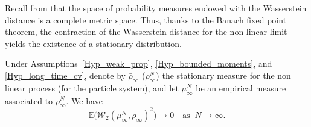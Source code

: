 Recall from \cite{bolley_separability} that the space of probability measures endowed with the Wasserstein distance is a complete metric space. Thus, thanks to the Banach fixed point theorem, the contraction of the Wasserstein distance for the non linear limit yields the existence of a stationary distribution.

\begin{lemma}
Under Assumptions~\ref{Hyp_weak_prop}, \ref{Hyp_bounded_moments}, and \ref{Hyp_long_time_cv}, denote by $\bar{\rho}_{\infty}$ (\resp $\rho^N_{\infty}$) the stationary measure for the non linear process (\resp for the particle system), and let $\mu^N_{\infty}$ be an empirical measure associated to $\rho^N_{\infty}$. We have
\[
\mathbb{E}\bigl(\mathcal{W}_2\left(\mu^N_{\infty},\bar{\rho}_{\infty}\right)^2\bigr)\to 0\quad\text{as }\ N\to\infty.
\]
\end{lemma}

